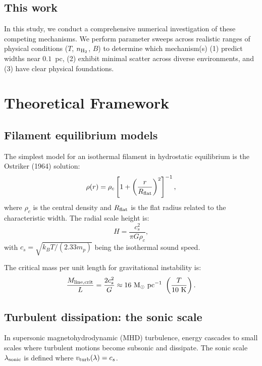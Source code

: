 \documentclass{mnras}
\begin{document}
\subsection{This work}

In this study, we conduct a comprehensive numerical investigation of these competing mechanisms. We perform parameter sweeps across realistic ranges of physical conditions ($T$, $n_{\rm H_2}$, $B$) to determine which mechanism(s) (1) predict widths near $0.1$~pc, (2) exhibit minimal scatter across diverse environments, and (3) have clear physical foundations.


\section{Theoretical Framework}

\subsection{Filament equilibrium models}

The simplest model for an isothermal filament in hydrostatic equilibrium is the Ostriker (1964) solution:
\begin{equation}
\rho(r) = \rho_c \left[1 + \left(\frac{r}{R_{\rm flat}}\right)^2\right]^{-1},
\end{equation}
where $\rho_c$ is the central density and $R_{\rm flat}$ is the flat radius related to the characteristic width. The radial scale height is:
\begin{equation}
H = \frac{c_s^2}{\pi G \rho_c},
\end{equation}
with $c_s = \sqrt{k_B T / (2.33 m_p)}$ being the isothermal sound speed.

The critical mass per unit length for gravitational instability is:
\begin{equation}
\frac{M_{\rm line,crit}}{L} = \frac{2c_s^2}{G} \approx 16~{\rm M}_\odot~{\rm pc}^{-1}~\left(\frac{T}{10~{\rm K}}\right).
\end{equation}

\subsection{Turbulent dissipation: the sonic scale}

In supersonic magnetohydrodynamic (MHD) turbulence, energy cascades to small scales where turbulent motions become subsonic and dissipate. The sonic scale $\lambda_{\rm sonic}$ is defined where $v_{\rm turb}(\lambda) = c_s$.
\end{document}
